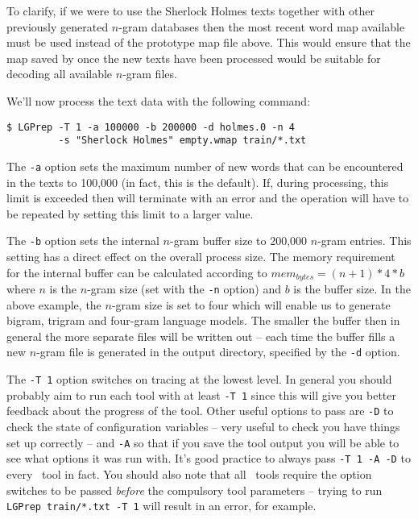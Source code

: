 To clarify, if we were to use the Sherlock Holmes texts together with
other previously generated $n$-gram databases then the most recent
word map available must be used instead of the prototype map file
above. This would ensure that the map saved by  once the
new texts have been processed would be suitable for decoding all
available $n$-gram files.

We'll now process the text data with the following command:
\begin{verbatim}
$ LGPrep -T 1 -a 100000 -b 200000 -d holmes.0 -n 4 
         -s "Sherlock Holmes" empty.wmap train/*.txt
\end{verbatim} %

The \texttt{-a} option sets the maximum number of new words that can
be encountered in the texts to 100,000 (in fact, this is the default).
If, during processing, this limit is exceeded then  will
terminate with an error and the operation will have to be repeated by
setting this limit to a larger value.

The \texttt{-b} option sets the internal $n$-gram buffer size to
200,000 $n$-gram entries. This setting has a direct effect on the
overall process size. The memory requirement for the internal buffer can
be calculated according to $mem_{bytes} = (n+1)*4*b$ where $n$ is the
$n$-gram size (set with the \texttt{-n} option) and $b$ is the buffer
size.  In the above example, the $n$-gram size is set to four which
will enable us to generate bigram, trigram and four-gram language
models.  The smaller the buffer then in general the more separate
files will be written out -- each time the buffer fills a new $n$-gram
file is generated in the output directory, specified by the {\tt -d}
option.

The {\tt -T 1} option switches on tracing at the lowest level.  In
general you should probably aim to run each tool with at least {\tt -T
1} since this will give you better feedback about the progress of the
tool.  Other useful options to pass are {\tt -D} to check the state of
configuration variables -- very useful to check you have things set up
correctly -- and {\tt -A} so that if you save the tool output you will
be able to see what options it was run with.  It's good practice to
always pass {\tt -T 1 -A -D} to every \HTK\ tool in fact.  You should
also note that all \HTK\ tools require the option switches to be
passed {\it before} the compulsory tool parameters -- trying to run
{\tt LGPrep train/*.txt -T 1} will result in an error, for example.

